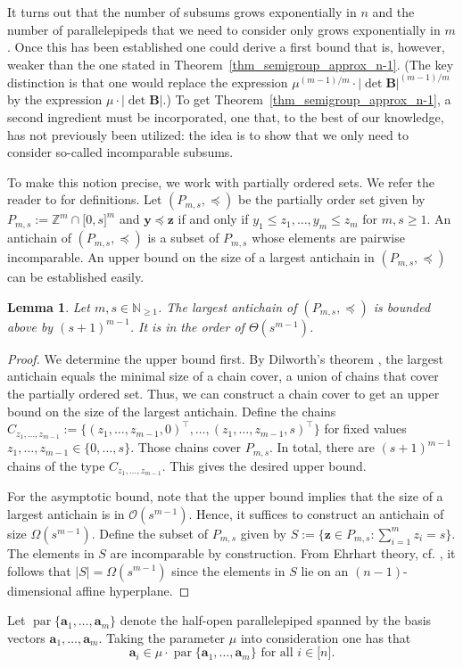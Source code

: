 \documentclass[pdflatex]{sn-jnl}
\DeclareMathOperator{\parr}{par}
\newcommand{\Z}{\mathbb{Z}}
\newcommand{\N}{\mathbb{N}}
\newcommand{\by}{\bm{y}}
\newcommand{\ba}{\bm{a}}
\newcommand{\bz}{\bm{z}}
\newcommand{\bB}{\bm{B}}
\theoremstyle{thmstyleone}%
\newtheorem{lemma}{Lemma}
\theoremstyle{thmstyletwo}%
\theoremstyle{thmstylethree}%
\begin{document}
	It turns out that the number of subsums grows exponentially in $n$ and the number of parallelepipeds that we need to consider only grows exponentially in $m$. Once this has been established one could derive a first bound that is, however, weaker than the one stated in Theorem~\ref{thm_semigroup_approx_n-1}. (The key distinction is that one would replace the expression $\mu^{(m-1)/m}\cdot\left|\det\bB\right|^{(m-1)/m}$ by the expression $\mu\cdot \left|\det\bB\right|$.) 
	To get Theorem~\ref{thm_semigroup_approx_n-1}, a second ingredient must be incorporated, one that, to the best of our knowledge, has not previously been utilized: the idea is to show that we only need to consider so-called incomparable subsums. 
	
	To make this notion precise, we work with partially ordered sets. We refer the reader to \cite[Chapter 3]{StanleyEC1} for definitions. Let  $(P_{m,s},\preceq)$ be the partially order set given by $P_{m,s} := \Z^m \cap \lbrack 0, s\rbrack^m$ and $\by \preceq \bz$ if and only if $y_1\leq z_1,\ldots,y_m\leq z_m$ for $m,s\geq 1$. An antichain of $(P_{m,s},\preceq)$ is a subset of $P_{m,s}$ whose elements are pairwise incomparable. An upper bound on the size of a largest antichain in $(P_{m,s},\preceq)$ can be established easily. 
	
	\begin{lemma}
		\label{lemma_semigroup_partial_order}
		Let $m,s\in\N_{\geq 1}$. The largest antichain of $(P_{m,s},\preceq)$ is bounded above by $(s+1)^{m-1}$. It is in the order  of $\Theta(s^{m-1})$.
	\end{lemma}
	\begin{proof}
		We  determine the upper bound first. By Dilworth's theorem \cite{dilworth1950decomposition}, the largest antichain equals the minimal size of a chain cover, a union of chains that cover the partially ordered set. Thus, we can construct a chain cover to get an upper bound on the size of the largest antichain. Define the chains $C_{z_1,\ldots,z_{m-1}} := \lbrace (z_1,\ldots,z_{m-1},0)^\top,\ldots, (z_1,\ldots,z_{m-1},s)^\top\rbrace$ for fixed values $z_1,\ldots,z_{m-1}\in\lbrace 0,\ldots,s\rbrace$. Those chains cover $P_{m,s}$. In total, there are $(s+1)^{m-1}$ chains of the type $C_{z_1,\ldots,z_{m-1}}$. This gives the desired upper bound. 
		
		For the asymptotic bound, note that the upper bound  implies that the size of a largest antichain is in $\mathcal{O}(s^{m-1})$. Hence, it suffices to construct an antichain of size $\Omega(s^{m-1})$. Define the subset of $P_{m,s}$ given by $S := \lbrace \bz\in P_{m,s} : \sum_{i=1}^m z_i = s\rbrace$. The elements in $S$ are incomparable by construction. From Ehrhart theory, cf. \cite[Chapter 3]{beck2007computing}, it follows that 
		$\left|S\right| = \Omega(s^{m-1})$ since the elements in $S$ lie on an $(n-1)$-dimensional affine hyperplane.
	\end{proof}
	Let $\parr\lbrace \ba_1,\ldots,\ba_m\rbrace$ denote the half-open parallelepiped spanned by the basis vectors $\ba_1,\ldots,\ba_m$. Taking  the parameter $\mu$ into consideration one has that  $$\ba_i\in\mu\cdot \parr\lbrace \ba_1,\ldots,\ba_m\rbrace \text{ for all } i\in\lbrack n\rbrack.$$
	
\end{document}
